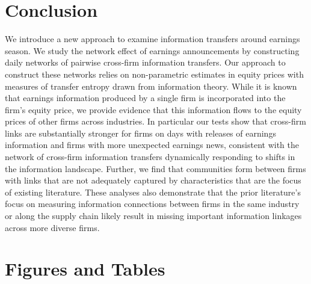 \section{Conclusion}

We introduce a new approach to examine information transfers around earnings season.  We study the network effect of earnings announcements by constructing daily networks of pairwise cross-firm information transfers.  Our approach to construct these networks relies on non-parametric estimates in equity prices with measures of transfer entropy drawn from information theory.  While it is known that earnings information produced by a single firm is incorporated into the firm's equity price,  we provide evidence that this information flows to the equity prices of other firms across industries.  In particular our tests show that cross-firm links are substantially stronger for firms on days with releases of earnings information and firms with more unexpected earnings news, consistent with the network of cross-firm information transfers dynamically responding to shifts in the information landscape.  Further,  we find that communities form between firms with links that are not adequately captured by characteristics that are the focus of existing literature.  These analyses also demonstrate that the prior literature’s focus on measuring information connections between firms in the same industry or along the supply chain likely result in missing important information linkages across more diverse firms. 





\newpage
\section{Figures and Tables}

